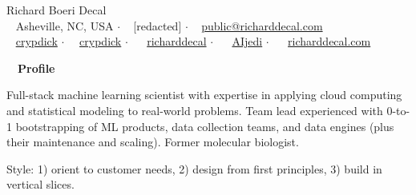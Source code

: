 \documentclass[a4paper,12pt]{article}
\newcommand{\resheading}[1]{{\hspace{-9pt} \colorbox{mygrey}{\begin{minipage}{\textwidth}{\textmd{~~\large \textbf{#1} \vphantom{p\^{E}}}}\end{minipage}}\vspace{6pt}} }
\begin{document}
    \begin{center}
    {\Huge Richard Boeri Decal}
        \\
        {\small \faMapMarker~ Asheville, NC, USA $\cdot$ \faPhone~ [redacted] $\cdot$ \faEnvelope~ \href{mailto:public@richarddecal.com}{public@richarddecal.com}  \\ \faGithubAlt~ \href{https://github.com/crypdick}{crypdick} $\cdot$~\faStackOverflow~  \href{https://stackoverflow.com/users/4212158/crypdick}{crypdick} $\cdot$ ~\faLinkedin~ \href{https://www.linkedin.com/in/richarddecal/}{richarddecal}  $\cdot$ ~\faTwitter~ \href{https://twitter.com/AIjedi}{AIjedi}  $\cdot$ ~\faHome~  \href{https://www.richarddecal.com}{richarddecal.com}}
    \end{center}

    \resheading{Profile}

    Full-stack machine learning scientist with expertise in applying cloud computing and statistical modeling to real-world problems.
    Team lead experienced with 0-to-1 bootstrapping of ML products, data collection teams, and data engines (plus their
     maintenance and scaling).
    Former molecular biologist.

    \vspace{0.5em} %

    Style: 1) orient to customer needs, 2) design from first principles, 3) build in vertical slices.\\


%
\end{document}
